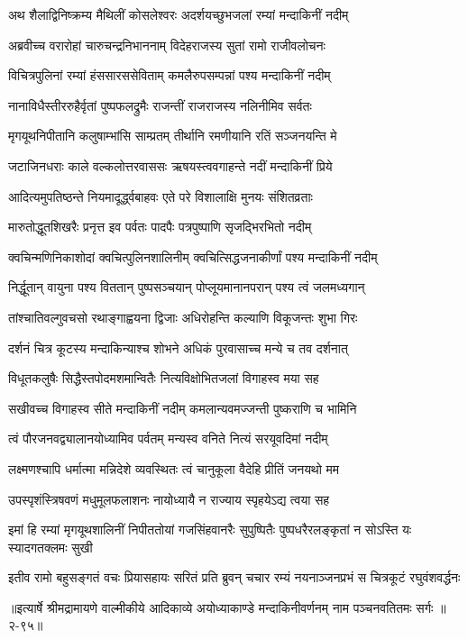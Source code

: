 
\twolineshloka
{अथ शैलाद्विनिष्क्रम्य मैथिलीं कोसलेश्वरः}
{अदर्शयच्छुभजलां रम्यां मन्दाकिनीं नदीम्} %

\twolineshloka
{अब्रवीच्च वरारोहां चारुचन्द्रनिभाननाम्}
{विदेहराजस्य सुतां रामो राजीवलोचनः} %

\twolineshloka
{विचित्रपुलिनां रम्यां हंससारससेविताम्}
{कमलैरुपसम्पन्नां पश्य मन्दाकिनीं नदीम्} %

\twolineshloka
{नानाविधैस्तीररुहैर्वृतां पुष्पफलद्रुमैः}
{राजन्तीं राजराजस्य नलिनीमिव सर्वतः} %

\twolineshloka
{मृगयूथनिपीतानि कलुषाम्भांसि साम्प्रतम्}
{तीर्थानि रमणीयानि रतिं सञ्जनयन्ति मे} %

\twolineshloka
{जटाजिनधराः काले वल्कलोत्तरवाससः}
{ऋषयस्त्ववगाहन्ते नदीं मन्दाकिनीं प्रिये} %

\twolineshloka
{आदित्यमुपतिष्ठन्ते नियमादूर्द्ध्वबाहवः}
{एते परे विशालाक्षि मुनयः संशितव्रताः} %

\twolineshloka
{मारुतोद्धूतशिखरैः प्रनृत्त इव पर्वतः}
{पादपैः पत्रपुष्पाणि सृजद्भिरभितो नदीम्} %

\twolineshloka
{क्वचिन्मणिनिकाशोदां क्वचित्पुलिनशालिनीम्}
{क्वचित्सिद्धजनाकीर्णां पश्य मन्दाकिनीं नदीम्} %

\twolineshloka
{निर्द्धूतान् वायुना पश्य विततान् पुष्पसञ्चयान्}
{पोप्लूयमानानपरान् पश्य त्वं जलमध्यगान्} %

\twolineshloka
{तांश्चातिवल्गुवचसो रथाङ्गाह्वयना द्विजाः}
{अधिरोहन्ति कल्याणि विकूजन्तः शुभा गिरः} %

\twolineshloka
{दर्शनं चित्र कूटस्य मन्दाकिन्याश्च शोभने}
{अधिकं पुरवासाच्च मन्ये च तव दर्शनात्} %

\twolineshloka
{विधूतकलुषैः सिद्धैस्तपोदमशमान्वितैः}
{नित्यविक्षोभितजलां विगाहस्व मया सह} %

\twolineshloka
{सखीवच्च विगाहस्व सीते मन्दाकिनीं नदीम्}
{कमलान्यवमज्जन्ती पुष्कराणि च भामिनि} %

\twolineshloka
{त्वं पौरजनवद्व्यालानयोध्यामिव पर्वतम्}
{मन्यस्व वनिते नित्यं सरयूवदिमां नदीम्} %

\twolineshloka
{लक्ष्मणश्चापि धर्मात्मा मन्निदेशे व्यवस्थितः}
{त्वं चानुकूला वैदेहि प्रीतिं जनयथो मम} %

\twolineshloka
{उपस्पृशंस्त्रिषवणं मधुमूलफलाशनः}
{नायोध्यायै न राज्याय स्पृहयेऽद्य त्वया सह} %

\twolineshloka
{इमां हि रम्यां मृगयूथशालिनीं निपीततोयां गजसिंहवानरैः}
{सुपुष्पितैः पुष्पधरैरलङ्कृतां न सोऽस्ति यः स्यादगतक्लमः सुखी} %

\twolineshloka
{इतीव रामो बहुसङ्गतं वचः प्रियासहायः सरितं प्रति ब्रुवन्}
{चचार रम्यं नयनाञ्जनप्रभं स चित्रकूटं रघुवंशवर्द्धनः} %


॥इत्यार्षे श्रीमद्रामायणे वाल्मीकीये आदिकाव्ये अयोध्याकाण्डे मन्दाकिनीवर्णनम् नाम पञ्चनवतितमः सर्गः ॥२-९५॥

